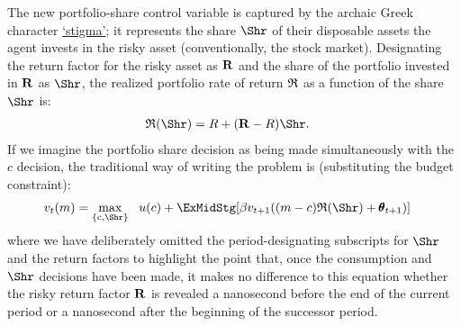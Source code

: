 \documentclass[titlepage, headings=optiontotocandhead]{Resources/texmf-local/tex/latex/econtex}
\begin{document}
The new portfolio-share control variable is captured by the archaic Greek character \href{https://en.wikipedia.org/wiki/Stigma_(ligature)}{`stigma'}; it represents the share $\Shr$ of their disposable assets the agent invests in the risky asset (conventionally, the stock market).  Designating the return factor for the risky asset as ${\mathbf{R}}$ and the share of the portfolio invested in ${\mathbf{R}}$ as $\Shr$, the realized portfolio rate of return $\mathfrak{R}$ as a function of the share $\Shr$ is:
\begin{equation}\begin{gathered}\begin{aligned}
      \Rport(\Shr) &= R+(\Risky-R)\Shr \label{eq:Shr}.
    \end{aligned}\end{gathered}\end{equation}
If we imagine the portfolio share decision as being made simultaneously with the $c$ decision, the traditional way of writing the problem is (substituting the budget constraint):
\begin{equation}\begin{gathered}\begin{aligned}
      v_{t}(m)  & = \max_{\{\cFunc,\Shr\}} ~~  u(c) + \ExMidStg[\beta v_{t+1}((m-c)\Rport(\Shr) + {\TranShkEmp}_{t+1})] \label{eq:Bellmanundated}
    \end{aligned}\end{gathered}\end{equation}
where we have deliberately omitted the {period}-designating subscripts for $\Shr$ and the return factors to highlight the point that, once the consumption and $\Shr$ decisions have been made, it makes no difference to this equation whether the risky return factor ${\mathbf{R}}$ is revealed a nanosecond before the end of the current {period} or a nanosecond after the beginning of the successor {period}.
\end{document}
